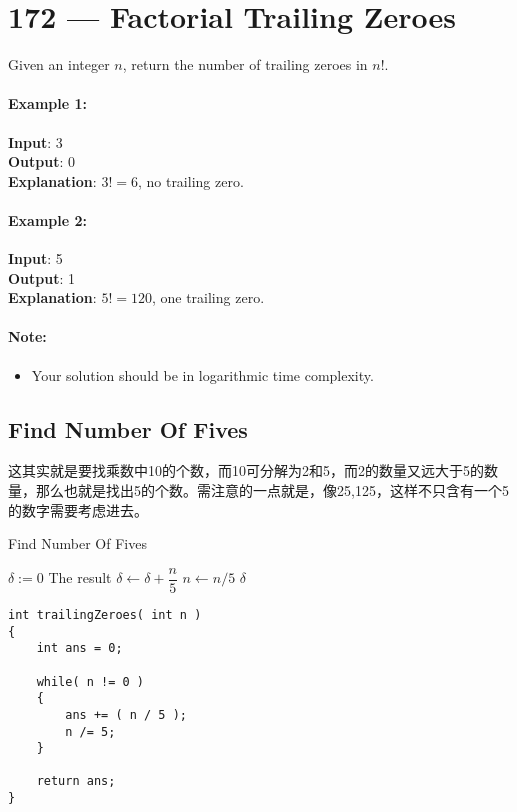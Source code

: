 \section{172 --- Factorial Trailing Zeroes}
Given an integer $n$, return the number of trailing zeroes in $n!$.
\paragraph{Example 1:}
\begin{flushleft}
\textbf{Input}: 3
\\
\textbf{Output}: 0
\\
\textbf{Explanation}: $3! = 6$, no trailing zero.
\end{flushleft}
\paragraph{Example 2:}
\begin{flushleft}
\textbf{Input}: 5
\\
\textbf{Output}: 1
\\
\textbf{Explanation}: $5! = 120$, one trailing zero.
\end{flushleft}
\paragraph{Note:}
\begin{itemize}
\item Your solution should be in logarithmic time complexity.
\end{itemize}
\subsection{Find Number Of Fives}
\begin{CJK*}{UTF8}{gbsn}
这其实就是要找乘数中10的个数，而10可分解为2和5，而2的数量又远大于5的数量，那么也就是找出5的个数。需注意的一点就是，像25,125，这样不只含有一个5的数字需要考虑进去。
\end{CJK*}
\setcounter{algorithm}{0}
\begin{algorithm}[H]
\caption{Find Number Of Fives}
\begin{algorithmic}[1]
\State $\delta:=0$ \Comment The result
\State $\delta\gets \delta + \dfrac{n}{5}$
\State $n\gets n/5$
\EndWhile
\State \Return $\delta$
\EndProcedure
\end{algorithmic}
\end{algorithm}
\setcounter{lstlisting}{0}
\begin{lstlisting}[style=customc, caption={Source Code}]
int trailingZeroes( int n )
{
    int ans = 0;

    while( n != 0 )
    {
        ans += ( n / 5 );
        n /= 5;
    }

    return ans;
}
\end{lstlisting}